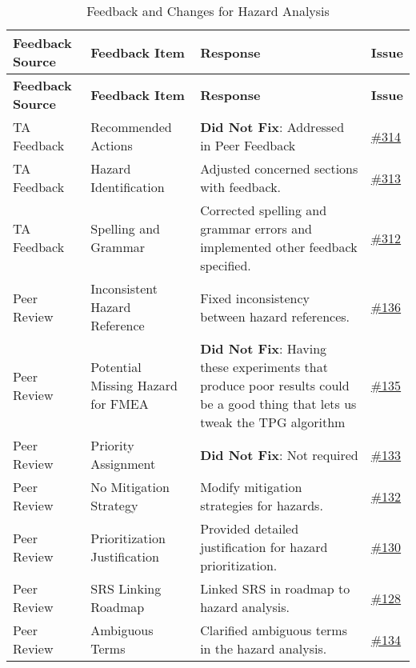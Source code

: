 \documentclass{article}
\begin{document}
\begin{longtable}{| p{} | p{} | p{} | p{} |}
    \caption{Feedback and Changes for Hazard Analysis} \\
    \hline
    \textbf{Feedback Source} & \textbf{Feedback Item} & \textbf{Response} & \textbf{Issue} \\
    \hline
    \endfirsthead
    \hline
    \textbf{Feedback Source} & \textbf{Feedback Item} & \textbf{Response} & \textbf{Issue} \\
    \hline
    \endhead
    \hline
    \endfoot
    TA Feedback & Recommended Actions & \textbf{Did Not Fix}: Addressed in Peer Feedback  & \href{https://github.com/TPGEngine/tpg/issues/314}{\#314} \\
    \hline
    TA Feedback & Hazard Identification & Adjusted concerned sections with feedback. & \href{https://github.com/TPGEngine/tpg/issues/313}{\#313} \\
    \hline
    TA Feedback & Spelling and Grammar & Corrected spelling and grammar errors and implemented other feedback specified. & \href{https://github.com/TPGEngine/tpg/issues/312}{\#312} \\
    \hline
    Peer Review & Inconsistent Hazard Reference & Fixed inconsistency between hazard references. & \href{https://github.com/TPGEngine/tpg/issues/136}{\#136} \\
    \hline
    Peer Review & Potential Missing Hazard for FMEA & \textbf{Did Not Fix}: Having these experiments that produce poor results could be a good thing that lets us tweak the TPG algorithm  & \href{https://github.com/TPGEngine/tpg/issues/135}{\#135} \\
    \hline
    Peer Review & Priority Assignment & \textbf{Did Not Fix}: Not required & \href{https://github.com/TPGEngine/tpg/issues/133}{\#133} \\
    \hline
    Peer Review & No Mitigation Strategy & Modify mitigation strategies for hazards. & \href{https://github.com/TPGEngine/tpg/issues/132}{\#132} \\
    \hline
    Peer Review & Prioritization Justification & Provided detailed justification for hazard prioritization. & \href{https://github.com/TPGEngine/tpg/issues/130}{\#130} \\
    \hline
    Peer Review & SRS Linking Roadmap & Linked SRS in roadmap to hazard analysis. & \href{https://github.com/TPGEngine/tpg/issues/128}{\#128} \\
    \hline
    Peer Review & Ambiguous Terms & Clarified ambiguous terms in the hazard analysis. & \href{https://github.com/TPGEngine/tpg/issues/134}{\#134} \\
    \hline
\end{longtable}
\end{document}
